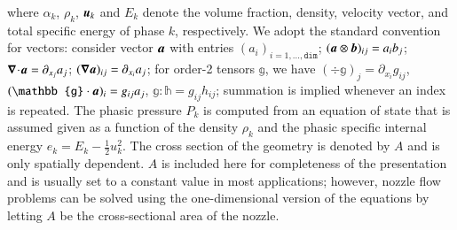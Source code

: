 \documentclass[preprint,10pt]{elsarticle}
\begin{document}
%
where $\alpha_k$, $\rho_k$, $\boldsymbol u_k$ and $E_k$ denote the volume fraction, density,  velocity vector, and total specific 
energy of phase $k$, respectively. We adopt the standard convention for vectors: consider vector $\boldsymbol a$ with entries $(a_i)_{i=1,\ldots,\texttt{dim}}$; $
(\boldsymbol a \otimes \boldsymbol b)_{ij}=a_i b_j$;
$\boldsymbol\nabla\! \cdot \! \boldsymbol a= \partial_{x_j} a_j$; $(\boldsymbol\nabla \boldsymbol a)_{ij} = \partial_{x_i} a_j$; for order-2 tensors $\mathbb{g}$, 
we have $(\div \mathbb{g})_j = \partial_{x_i} g_{ij}$, $(\mathbb{g}\cdot \mbold{a})_i = g_{ij}a_j$, 
$\mathbb{g}:\mathbb{h} = g_{ij} h_{ij}$; summation is implied whenever an index is repeated. 
The phasic pressure $P_k$ is computed from an equation of state that is assumed given as a function of the density $\rho_k$ and 
the phasic specific internal energy $e_k = E_k - \tfrac{1}{2} u^2_k$. The cross section of the geometry is denoted by $A$ and is only 
spatially dependent. $A$ is included here for completeness of the presentation and is usually set to a constant value in most applications; however, 
nozzle flow problems can be solved using the one-dimensional version of the equations by letting $A$ be the cross-sectional area 
of the nozzle. 
\end{document}
